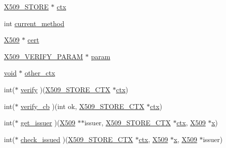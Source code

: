 \begin{DoxyCompactItemize}
\item 
\hyperlink{crypto_2ossl__typ_8h_a3a2b800bae08729d11bc28f12b795597}{X509\+\_\+\+S\+T\+O\+RE} $\ast$ \hyperlink{structx509__store__ctx__st_aa973d937ba47a33a68291d398736da71}{ctx}
\item 
int \hyperlink{structx509__store__ctx__st_a3cc88a43c9f9a36aa99d346afaa3ecb2}{current\+\_\+method}
\item 
\hyperlink{crypto_2ossl__typ_8h_a4f666bde6518f95deb3050c54b408416}{X509} $\ast$ \hyperlink{structx509__store__ctx__st_a2fb0a168ce33f1f9ce519813d94887f0}{cert}
\item 
\hyperlink{crypto_2x509_2x509__vfy_8h_a9b8209a7a29bafa279e1b5bc5f81cb23}{X509\+\_\+\+V\+E\+R\+I\+F\+Y\+\_\+\+P\+A\+R\+AM} $\ast$ \hyperlink{structx509__store__ctx__st_a93a023e30bcb76ab78c9bdb0db7a24f8}{param}
\item 
\hyperlink{hw__4758__cca_8h_afad4d591c7931ff6dc5bf69c76c96aa0}{void} $\ast$ \hyperlink{structx509__store__ctx__st_af8a1a25e7985988a5eecbdb1dce0024a}{other\+\_\+ctx}
\item 
int($\ast$ \hyperlink{structx509__store__ctx__st_ac3a2bd38c545830a826a7d26031473d1}{verify} )(\hyperlink{crypto_2ossl__typ_8h_ae681945a2cf88d6337137dc0260a1545}{X509\+\_\+\+S\+T\+O\+R\+E\+\_\+\+C\+TX} $\ast$\hyperlink{structx509__store__ctx__st_aa973d937ba47a33a68291d398736da71}{ctx})
\item 
int($\ast$ \hyperlink{structx509__store__ctx__st_a7a498a0e2b66a935922a642eeebfc183}{verify\+\_\+cb} )(int ok, \hyperlink{crypto_2ossl__typ_8h_ae681945a2cf88d6337137dc0260a1545}{X509\+\_\+\+S\+T\+O\+R\+E\+\_\+\+C\+TX} $\ast$\hyperlink{structx509__store__ctx__st_aa973d937ba47a33a68291d398736da71}{ctx})
\item 
int($\ast$ \hyperlink{structx509__store__ctx__st_ac4f2db1b4c777ae1a8e1825848e6544c}{get\+\_\+issuer} )(\hyperlink{crypto_2ossl__typ_8h_a4f666bde6518f95deb3050c54b408416}{X509} $\ast$$\ast$issuer, \hyperlink{crypto_2ossl__typ_8h_ae681945a2cf88d6337137dc0260a1545}{X509\+\_\+\+S\+T\+O\+R\+E\+\_\+\+C\+TX} $\ast$\hyperlink{structx509__store__ctx__st_aa973d937ba47a33a68291d398736da71}{ctx}, \hyperlink{crypto_2ossl__typ_8h_a4f666bde6518f95deb3050c54b408416}{X509} $\ast$\hyperlink{include_2openssl_2pem_8h_a97dc7cf0c4554cbe9a4b58bfe9a749f5}{x})
\item 
int($\ast$ \hyperlink{structx509__store__ctx__st_a1d9c17fcd1eb6255bb12ff3e6cf2852b}{check\+\_\+issued} )(\hyperlink{crypto_2ossl__typ_8h_ae681945a2cf88d6337137dc0260a1545}{X509\+\_\+\+S\+T\+O\+R\+E\+\_\+\+C\+TX} $\ast$\hyperlink{structx509__store__ctx__st_aa973d937ba47a33a68291d398736da71}{ctx}, \hyperlink{crypto_2ossl__typ_8h_a4f666bde6518f95deb3050c54b408416}{X509} $\ast$\hyperlink{include_2openssl_2pem_8h_a97dc7cf0c4554cbe9a4b58bfe9a749f5}{x}, \hyperlink{crypto_2ossl__typ_8h_a4f666bde6518f95deb3050c54b408416}{X509} $\ast$issuer)
$$
\end{DoxyCompactItemize}
